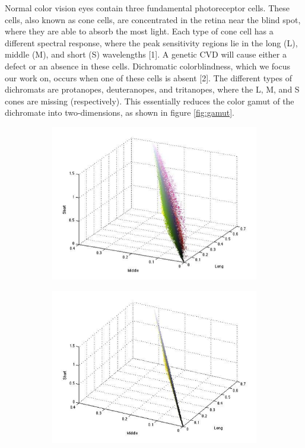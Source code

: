 \documentclass[10pt,twocolumn,letterpaper]{article}
\begin{document}
Normal color vision eyes contain three fundamental photoreceptor cells. These cells, also known as cone cells, are concentrated in the retina near the blind spot, where they are able to absorb the most light. Each type of cone cell has a different spectral response, where the peak sensitivity regions lie in the long (L), middle (M), and short (S) wavelengths [1]. A genetic CVD will cause either a defect or an absence in these cells. Dichromatic colorblindness, which we focus our work on, occurs when one of these cells is absent [2]. The different types of dichromats are protanopes, deuteranopes, and tritanopes, where the L, M, and S cones are missing (respectively). This essentially reduces the color gamut of the dichromate into two-dimensions, as shown in figure \ref{fig:gamut}.  

\begin{figure}[h]
  \centering
  \begin{subfigure}{0.22\textwidth}
    \includegraphics[width=\textwidth]{gamut1.png}
    \caption{}
  \end{subfigure}
  \begin{subfigure}{0.22\textwidth}
    \includegraphics[width=\textwidth]{gamut2.png}

\end{subfigure}
\end{figure}
\end{document}
